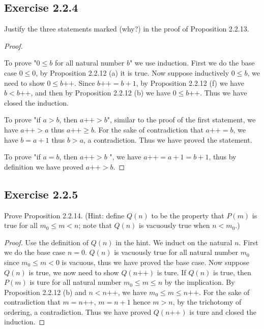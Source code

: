 \documentclass[a4paper]{article}
\begin{document}
\subsection*{Exercise 2.2.4}

Justify the three statements marked (why?) in the proof of Proposition 2.2.13.

\begin{proof}

$ $\newline

To prove "$0 \le b$ for all natural number $b$" we use induction. First we do the base case $0 \le 0$, by Proposition 2.2.12 (a) it is true. Now suppose inductively $0 \le b$, we need to show $0 \le b\text{++}$. Since $b\text{++} = b + 1$, by Proposition 2.2.12 (f) we have $b < b\text{++}$, and then by Proposition 2.2.12 (b) we have $0 \le b\text{++}$. Thus we have closed the induction.

To prove "if $a > b$, then $a\text{++} > b$", similar to the proof of the first statement, we have $a\text{++} > a$ thus $a\text{++} \ge b$. For the sake of contradiction that $a\text{++} = b$, we have $b = a + 1$ thus $b > a$, a contradiction. Thus we have proved the statement.

To prove "if  $a = b$, then $a\text{++} > b$ ", we have $a\text{++} = a + 1 = b + 1$, thus by definition we have proved $a\text{++} > b$.

\end{proof}

\subsection*{Exercise 2.2.5}

Prove Proposition 2.2.14. (Hint: define $Q(n)$ to be the property that $P(m)$ is true for all $m_0 \le m < n$; note that $Q(n)$ is vacuously true when $n < m_0$.)

\begin{proof}

Use the definition of $Q(n)$ in the hint. We induct on the natural $n$. First we do the base case  $n = 0$. $Q(n)$ is vacuously true for all natural number  $m_0$ since $m_0 \le m < 0$ is vacuous, thus we have proved the base case. Now suppose $Q(n)$ is true, we now need to show $Q(n\text{++})$ is ture. If $Q(n)$ is true, then $P\left( m \right)$ is ture for all natural number $m_0 \le m \le n$ by the implication. By Proposition 2.2.12 (b) and $n < n\text{++}$, we have $m_0 \le m \le n\text{++}$. For the sake of contradiction that $m = n\text{++}$, $m = n + 1$ hence $m > n$, by the trichotomy of ordering, a contradiction. Thus we have proved $Q(n\text{++})$ is ture and closed the induction.

\end{proof}
\end{document}
